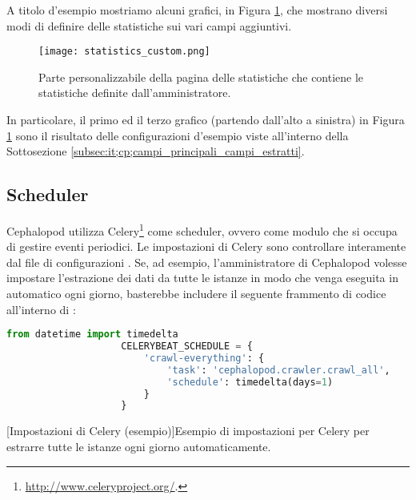         	A titolo d'esempio mostriamo alcuni grafici, in Figura \ref{fig:statistics_custom}, che mostrano diversi modi di definire delle statistiche sui vari campi aggiuntivi.
        	
        	\begin{figure}[h!]
        		\begin{center}
        			\texttt{[image: statistics\_custom.png]}
        		\end{center}
        		\caption[Statistiche definite dall'amministratore]{Parte personalizzabile della pagina delle statistiche che contiene le statistiche definite dall'amministratore.}
        		\label{fig:statistics_custom}
        	\end{figure}
        	
        	In particolare, il primo ed il terzo grafico (partendo dall'alto a sinistra) in Figura \ref{fig:statistics_custom} sono il risultato delle configurazioni d'esempio viste all'interno della Sottosezione \ref{subsec:it;cp;campi_principali_campi_estratti}.
        
        \subsection{Scheduler} \label{subsec:it;cp;scheduler}
        
            Cephalopod utilizza Celery\footnote{\url{http://www.celeryproject.org/}.} come scheduler, ovvero come modulo che si occupa di gestire eventi periodici. Le impostazioni di Celery sono controllare interamente dal file di configurazioni . Se, ad esempio, l'amministratore di Cephalopod volesse impostare l'estrazione dei dati da tutte le istanze in modo che venga eseguita in automatico ogni giorno, basterebbe includere il seguente frammento di codice all'interno di :
            
            \begin{center}
                \begin{lstlisting}[language=python, gobble=18]
                    from datetime import timedelta
                    CELERYBEAT_SCHEDULE = {
                        'crawl-everything': {
                            'task': 'cephalopod.crawler.crawl_all',
                            'schedule': timedelta(days=1)
                        }
                    }
                \end{lstlisting}
                \captionsetup{textformat=empty,labelformat=empty} \vspace{-2em}
                [Impostazioni di Celery (esempio)]{Esempio di impostazioni per Celery per estrarre tutte le istanze ogni giorno automaticamente.}
            \end{center}
            
